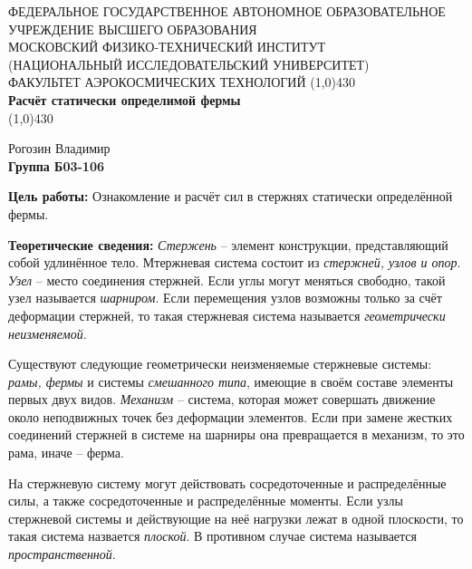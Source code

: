 \documentclass[a4paper,12pt]{article}
\begin{document}
\begin{titlepage}
\begin{center}
\large{\small ФЕДЕРАЛЬНОЕ ГОСУДАРСТВЕННОЕ АВТОНОМНОЕ ОБРАЗОВАТЕЛЬНОЕ\\ УЧРЕЖДЕНИЕ ВЫСШЕГО ОБРАЗОВАНИЯ \\ МОСКОВСКИЙ ФИЗИКО-ТЕХНИЧЕСКИЙ ИНСТИТУТ\\ (НАЦИОНАЛЬНЫЙ ИССЛЕДОВАТЕЛЬСКИЙ УНИВЕРСИТЕТ)\\ ФАКУЛЬТЕТ АЭРОКОСМИЧЕСКИХ ТЕХНОЛОГИЙ}
\vfill
\line(1,0){430}\\[1mm]
\huge\textbf{Расчёт статически определимой фермы}\\
\line(1,0){430}\\[1mm]
\vfill
\begin{flushright}
\normalsize{Рогозин Владимир}\\
\normalsize{\textbf{Группа Б03-106}}\\
\end{flushright}
\end{center}
\end{titlepage}

\textbf{Цель работы:} 
Ознакомление и расчёт сил в стержнях статически определённой фермы.

\textbf{Теоретические сведения:} \textit{Стержень} -- элемент конструкции, представляющий собой удлинённое тело. Мтержневая система состоит из \textit{стержней, узлов и опор}. \textit{Узел} -- место соединения стержней. Если углы могут меняться свободно, такой узел называется \textit{шарниром}. Если перемещения узлов возможны только за счёт деформации стержней, то такая стержневая система называется \textit{геометрически неизменяемой}.

Существуют следующие геометрически неизменяемые стержневые системы: 
\textit{рамы, фермы} и системы \textit{смешанного типа}, имеющие в своём составе элементы первых двух видов. \textit{Механизм} -- система, которая может совершать движение около неподвижных точек без деформации элементов. Если при замене жестких соединений стержней в системе на шарниры она превращается в механизм, то это рама, иначе -- ферма. 

На стержневую систему могут действовать сосредоточенные и распределённые силы, а также сосредоточенные и распределённые моменты. Если узлы стержневой системы и действующие на неё нагрузки лежат в одной плоскости, то такая система назвается \textit{плоской}. В противном случае система называется \textit{пространственной}.
\end{document}
